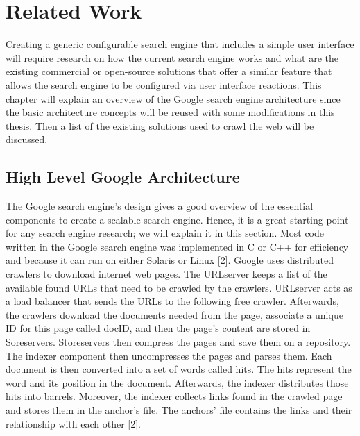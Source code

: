\chapter{Related Work}
\label{chap:relatedwork}
Creating a generic configurable search engine that includes a simple user interface will require research on how the current search engine works and what are the existing commercial or open-source solutions that offer a similar feature that allows the search engine to be configured via user interface reactions. This chapter will explain an overview of the Google search engine architecture since the basic architecture concepts will be reused with some modifications in this thesis. Then a list of the existing solutions used to crawl the web will be discussed.  



\section{High Level Google Architecture}

The Google search engine's design gives a good overview of the essential components to create a scalable search engine. Hence, it is a great starting point for any search engine research; we will explain it in this section. Most code written in the Google search engine was implemented in C or C++ for efficiency and because it can run on either Solaris or Linux [2]. Google uses distributed crawlers to download internet web pages. The URLserver keeps a list of the available found URLs that need to be crawled by the crawlers. URLserver acts as a load balancer that sends the URLs to the following free crawler. Afterwards, the crawlers download the documents needed from the page, associate a unique ID for this page called docID, and then the page's content are stored in Soreservers. Storeservers then compress the pages and save them on a repository. The indexer component then uncompresses the pages and parses them. Each document is then converted into a set of words called hits. The hits represent the word and its position in the document. Afterwards, the indexer distributes those hits into barrels. Moreover, the indexer collects links found in the crawled page and stores them in the anchor's file. The anchors' file contains the links and their relationship with each other [2].


